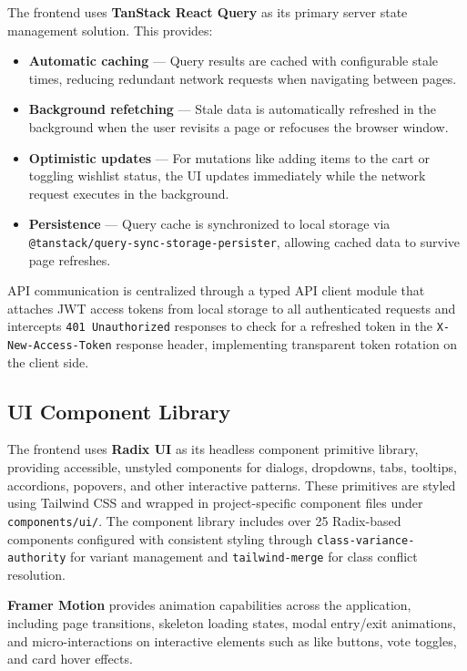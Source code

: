 The frontend uses \textbf{TanStack React Query} as its primary server state management solution. This provides:

\begin{itemize}[leftmargin=*]
    \item \textbf{Automatic caching} --- Query results are cached with configurable stale times, reducing redundant network requests when navigating between pages.
    \item \textbf{Background refetching} --- Stale data is automatically refreshed in the background when the user revisits a page or refocuses the browser window.
    \item \textbf{Optimistic updates} --- For mutations like adding items to the cart or toggling wishlist status, the UI updates immediately while the network request executes in the background.
    \item \textbf{Persistence} --- Query cache is synchronized to local storage via \texttt{@tanstack/query-sync-storage-persister}, allowing cached data to survive page refreshes.
\end{itemize}

API communication is centralized through a typed API client module that attaches JWT access tokens from local storage to all authenticated requests and intercepts \texttt{401 Unauthorized} responses to check for a refreshed token in the \texttt{X-New-Access-Token} response header, implementing transparent token rotation on the client side.

\subsection{UI Component Library}

The frontend uses \textbf{Radix UI} as its headless component primitive library, providing accessible, unstyled components for dialogs, dropdowns, tabs, tooltips, accordions, popovers, and other interactive patterns. These primitives are styled using Tailwind CSS and wrapped in project-specific component files under \texttt{components/ui/}. The component library includes over 25 Radix-based components configured with consistent styling through \texttt{class-variance-authority} for variant management and \texttt{tailwind-merge} for class conflict resolution.

\textbf{Framer Motion} provides animation capabilities across the application, including page transitions, skeleton loading states, modal entry/exit animations, and micro-interactions on interactive elements such as like buttons, vote toggles, and card hover effects.

